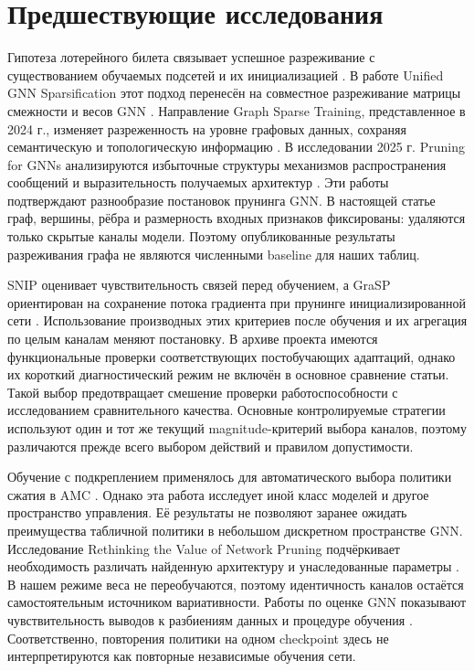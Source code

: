 \documentclass[10pt,a4paper]{article}
\begin{document}
\section*{Предшествующие исследования}
Гипотеза лотерейного билета связывает успешное разреживание с существованием обучаемых подсетей и их инициализацией \cite{r4}. В работе Unified GNN Sparsification этот подход перенесён на совместное разреживание матрицы смежности и весов GNN \cite{r5}. Направление Graph Sparse Training, представленное в 2024 г., изменяет разреженность на уровне графовых данных, сохраняя семантическую и топологическую информацию \cite{r6}. В исследовании 2025 г. Pruning for GNNs анализируются избыточные структуры механизмов распространения сообщений и выразительность получаемых архитектур \cite{r7}. Эти работы подтверждают разнообразие постановок прунинга GNN. В настоящей статье граф, вершины, рёбра и размерность входных признаков фиксированы: удаляются только скрытые каналы модели. Поэтому опубликованные результаты разреживания графа не являются численными baseline для наших таблиц.

SNIP оценивает чувствительность связей перед обучением, а GraSP ориентирован на сохранение потока градиента при прунинге инициализированной сети \cite{r8,r9}. Использование производных этих критериев после обучения и их агрегация по целым каналам меняют постановку. В архиве проекта имеются функциональные проверки соответствующих постобучающих адаптаций, однако их короткий диагностический режим не включён в основное сравнение статьи. Такой выбор предотвращает смешение проверки работоспособности с исследованием сравнительного качества. Основные контролируемые стратегии используют один и тот же текущий magnitude-критерий выбора каналов, поэтому различаются прежде всего выбором действий и правилом допустимости.

Обучение с подкреплением применялось для автоматического выбора политики сжатия в AMC \cite{r10}. Однако эта работа исследует иной класс моделей и другое пространство управления. Её результаты не позволяют заранее ожидать преимущества табличной политики в небольшом дискретном пространстве GNN. Исследование Rethinking the Value of Network Pruning подчёркивает необходимость различать найденную архитектуру и унаследованные параметры \cite{r11}. В нашем режиме веса не переобучаются, поэтому идентичность каналов остаётся самостоятельным источником вариативности. Работы по оценке GNN показывают чувствительность выводов к разбиениям данных и процедуре обучения \cite{r12}. Соответственно, повторения политики на одном checkpoint здесь не интерпретируются как повторные независимые обучения сети.
\end{document}
